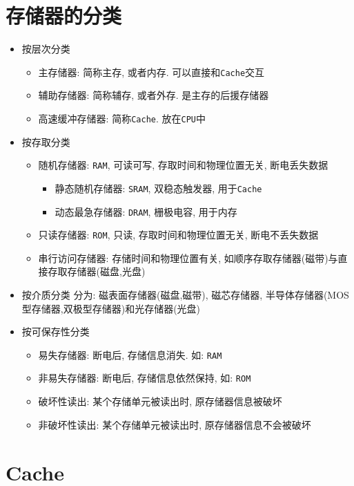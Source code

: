 \section{存储器的分类}
\begin{itemize}
\item 按层次分类
\begin{itemize}
\item 主存储器: 简称主存, 或者内存. 可以直接和\verb|Cache|交互
\item 辅助存储器: 简称辅存, 或者外存. 是主存的后援存储器
\item 高速缓冲存储器: 简称\verb|Cache|. 放在\verb|CPU|中
\end{itemize}
\item 按存取分类
\begin{itemize}
\item 随机存储器: \verb|RAM|, 可读可写, 存取时间和物理位置无关, 断电丢失数据
\begin{itemize}
\item 静态随机存储器: \verb|SRAM|, 双稳态触发器, 用于\verb|Cache|
\item 动态最急存储器: \verb|DRAM|, 栅极电容, 用于内存
\end{itemize}
\item 只读存储器: \verb|ROM|, 只读, 存取时间和物理位置无关, 断电不丢失数据
\item 串行访问存储器: 存储时间和物理位置有关, 如顺序存取存储器(磁带)与直接存取存储器(磁盘,光盘)
\end{itemize}
\item 按介质分类
分为: 磁表面存储器(磁盘,磁带), 磁芯存储器, 半导体存储器(MOS型存储器,双极型存储器)和光存储器(光盘)
\item 按可保存性分类
\begin{itemize}
\item 易失存储器: 断电后, 存储信息消失. 如: \verb|RAM|
\item 非易失存储器: 断电后, 存储信息依然保持, 如: \verb|ROM|
\item 破坏性读出: 某个存储单元被读出时, 原存储器信息被破坏
\item 非破坏性读出: 某个存储单元被读出时, 原存储器信息不会被破坏
\end{itemize}
\end{itemize}
\section{Cache}













